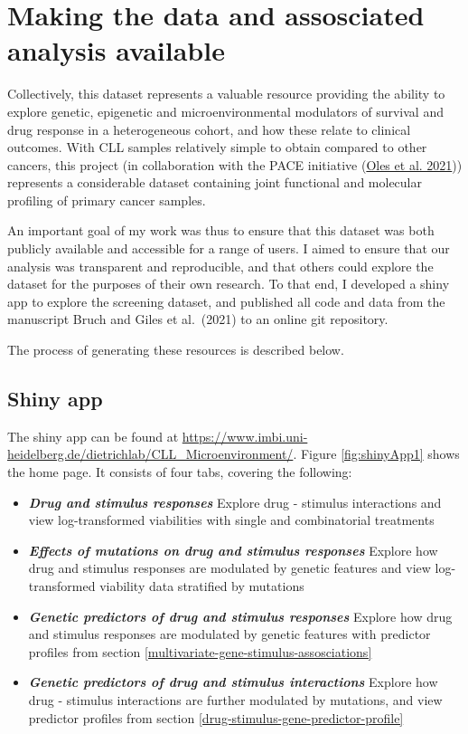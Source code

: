 \documentclass[11pt, a4paper, twosided]{book}
\begin{document}
\hypertarget{making-the-data-and-assosciated-analysis-available}{%
\section{Making the data and assosciated analysis available}\label{making-the-data-and-assosciated-analysis-available}}

Collectively, this dataset represents a valuable resource providing the ability to explore genetic, epigenetic and microenvironmental modulators of survival and drug response in a heterogeneous cohort, and how these relate to clinical outcomes. With CLL samples relatively simple to obtain compared to other cancers, this project (in collaboration with the PACE initiative (\protect\hyperlink{ref-R-BloodCancerMultiOmics2017}{Oles et al. 2021})) represents a considerable dataset containing joint functional and molecular profiling of primary cancer samples.

An important goal of my work was thus to ensure that this dataset was both publicly available and accessible for a range of users. I aimed to ensure that our analysis was transparent and reproducible, and that others could explore the dataset for the purposes of their own research. To that end, I developed a shiny app to explore the screening dataset, and published all code and data from the manuscript Bruch and Giles et al.~(2021) to an online git repository.

The process of generating these resources is described below.

\hypertarget{shiny-app}{%
\subsection{Shiny app}\label{shiny-app}}

The shiny app can be found at \url{https://www.imbi.uni-heidelberg.de/dietrichlab/CLL_Microenvironment/}. Figure \ref{fig:shinyApp1} shows the home page. It consists of four tabs, covering the following:
\begin{itemize}
    \item  \textbf{\textit{Drug and stimulus responses}} Explore drug - stimulus interactions and view log-transformed viabilities with single and combinatorial treatments
    \item \textbf{\textit{Effects of mutations on drug and stimulus responses}} Explore how drug and stimulus responses are modulated by genetic features and view log-transformed viability data stratified by mutations
    \item \textbf{\textit{Genetic predictors of drug and stimulus responses}} Explore how drug and stimulus responses are modulated by genetic features with predictor profiles from section \ref{multivariate-gene-stimulus-assosciations}
    \item \textbf{\textit{Genetic predictors of drug and stimulus interactions}} Explore how drug - stimulus interactions are further modulated by mutations, and view predictor profiles from section \ref{drug-stimulus-gene-predictor-profile}

\end{itemize}
\end{document}
